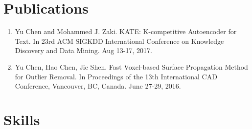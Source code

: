 \documentclass[11pt,letterpaper,sans]{moderncv} %
\begin{document}





\section{Publications}
\begin{enumerate}
\item Yu Chen and Mohammed J. Zaki. KATE: K-competitive Autoencoder for Text. In 23rd ACM SIGKDD International Conference on Knowledge Discovery and Data Mining. Aug 13-17, 2017.
\item Yu Chen, Hao Chen, Jie Shen. Fast Voxel-based Surface Propagation Method for Outlier Removal. In Proceedings of the 13th International CAD Conference, Vancouver, BC, Canada. June 27-29, 2016.
\end{enumerate}


\section{Skills}

\end{document}
